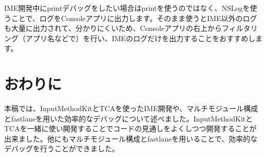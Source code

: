 \documentclass[uplatex,a4j,12pt,twocolumn]{jsarticle}
\begin{document}
IME開発中にprintデバッグをしたい場合はprintを使うのではなく、NSLogを使うことで、ログをConsoleアプリ\cite{bib:console}に出力します。そのまま使うとIME以外のログも大量に出力されて、分かりにくいため、Consoleアプリの右上からフィルタリング（アプリ名などで）を行い、IMEのログだけを出力することをおすすめします。

\section{おわりに}\label{sec:conclusion}
本稿では、InputMethodKitとTCAを使ったIME開発や、マルチモジュール構成とfastlaneを用いた効率的なデバッグについて述べました。InputMethodKitとTCAを一緒に使い開発することでコードの見通しをよくしつつ開発することが出来ました。他にもマルチモジュール構成とfastlaneを用いることで、効率的なデバッグを行うことができました。

 
 
\end{document}
